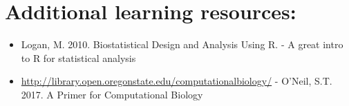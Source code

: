 \documentclass[]{book}
\begin{document}
\hypertarget{additional-learning-resources-1}{%
\section{Additional learning resources:}\label{additional-learning-resources-1}}

\begin{itemize}
\item
  Logan, M. 2010. Biostatistical Design and Analysis Using R. - A great intro to R for statistical analysis
\item
  \url{http://library.open.oregonstate.edu/computationalbiology/} - O'Neil, S.T. 2017. A Primer for Computational Biology
\end{itemize}


\end{document}
